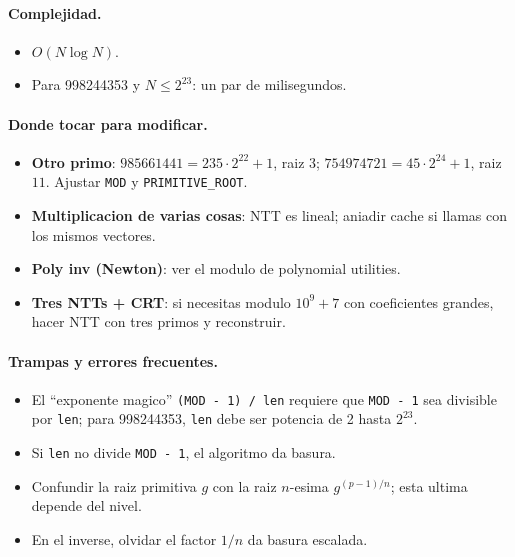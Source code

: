 \paragraph{Complejidad.}
\begin{itemize}\setlength\itemsep{0pt}
	\item $O(N \log N)$.
	\item Para 998244353 y $N \le 2^{23}$: un par de milisegundos.
\end{itemize}

\paragraph{Donde tocar para modificar.}
\begin{itemize}\setlength\itemsep{0pt}
	\item \textbf{Otro primo}: $985661441 = 235 \cdot 2^{22} + 1$, raiz $3$; $754974721 = 45 \cdot 2^{24} + 1$, raiz $11$. Ajustar \texttt{MOD} y \texttt{PRIMITIVE\_ROOT}.
	\item \textbf{Multiplicacion de varias cosas}: NTT es lineal; aniadir cache si llamas con los mismos vectores.
	\item \textbf{Poly inv (Newton)}: ver el modulo de polynomial utilities.
	\item \textbf{Tres NTTs + CRT}: si necesitas modulo $10^9 + 7$ con coeficientes grandes, hacer NTT con tres primos y reconstruir.
\end{itemize}

\paragraph{Trampas y errores frecuentes.}
\begin{itemize}\setlength\itemsep{0pt}
	\item El ``exponente magico'' \texttt{(MOD - 1) / len} requiere que \texttt{MOD - 1} sea divisible por \texttt{len}; para 998244353, \texttt{len} debe ser potencia de 2 hasta $2^{23}$.
	\item Si \texttt{len} no divide \texttt{MOD - 1}, el algoritmo da basura.
	\item Confundir la raiz primitiva $g$ con la raiz $n$-esima $g^{(p-1)/n}$; esta ultima depende del nivel.
	\item En el inverse, olvidar el factor $1/n$ da basura escalada.
\end{itemize}


